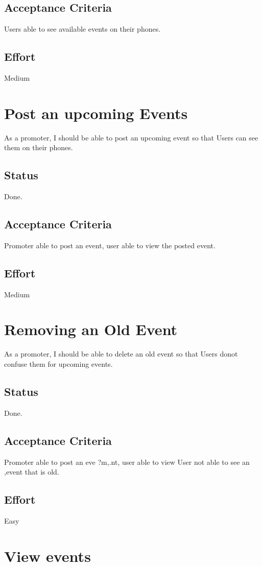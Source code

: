 \documentclass[10pt,a4paper]{article}
\begin{document}
\subsection{Acceptance Criteria}
Users able to see available events on their phones.
\subsection{Effort}
Medium

\section{Post an upcoming Events}
As a promoter, I should be able to post an upcoming event so that Users can see them on their phones.
\subsection{Status}
Done.
\subsection{Acceptance Criteria}
Promoter able to post an event, user able to view the posted event.
\subsection{Effort}
Medium

\section{Removing an Old Event}
As a promoter, I should be able to delete an old event so that Users donot confuse them for upcoming events.
\subsection{Status}
Done.
\subsection{Acceptance Criteria}
Promoter able to post an eve ?m,.nt, user able to view User not able to see an ,event that is old.
\subsection{Effort}
Easy

\section{View events}
\end{document}
